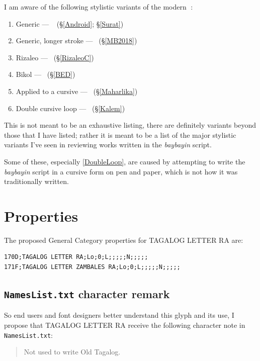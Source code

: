 \documentclass[a4paper,pagesize,openany,14pt,parskip=never]{scrbook}
\newcommand{\≈}{$\approx$}
\newcommand{\ra}{{\baybayin ᜍ}}
\newcommand{\rizaleoRA}{{\baybayinb \symbol{"E005}}}
\begin{document}
I am aware of the following stylistic variants of the modern \ra:

\begin{enumerate}
    \item Generic --- \ra\ (\S\ref{Android}; \S\ref{Surat})
    \item Generic, longer stroke --- {\baybayinb {}}\ (\S\ref{MB2018})
    \item Rizaleo --- \rizaleoRA\ (\S\ref{RizaleoC})
    \item Bikol --- {\baybayinb {}}\ (\S\ref{BED})
    \item Applied to a cursive {\baybayinb {}} --- {\baybayinb {}}\ (\S\ref{Maharlika})
    \item\label{DoubleLoop} Double cursive loop --- {\baybayinb {}}\ (\S\ref{Kalem})
\end{enumerate}

This is not meant to be an exhaustive listing, there are definitely variants beyond those that I have listed; rather it is meant to be a list of the major stylistic variants I've seen in reviewing works written in the {\em baybayin} script.

Some of these, especially \textnumero\ref{DoubleLoop}, are caused by attempting to write the {\em baybayin} script in a cursive form on pen and paper, which is not how it was traditionally written.

\section{Properties}
The proposed General Category properties for \textsf{TAGALOG LETTER RA} are:

\begin{verbatim}
170D;TAGALOG LETTER RA;Lo;0;L;;;;;N;;;;;
171F;TAGALOG LETTER ZAMBALES RA;Lo;0;L;;;;;N;;;;;
\end{verbatim}

\subsection{\texttt{NamesList.txt} character remark}

So end users and font designers better understand this glyph and its use, I propose that \textsf{TAGALOG LETTER RA} receive the following character note in \texttt{NamesList.txt}:

\begin{quote}
    Not used to write Old Tagalog.
\end{quote}
\end{document}

